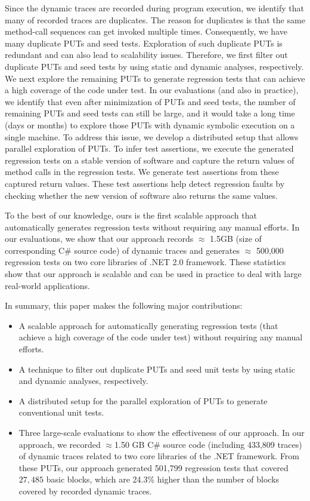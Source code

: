 Since the dynamic traces are recorded during program execution, we identify that many of recorded traces are duplicates. The reason for duplicates is that the same method-call sequences can get invoked multiple times. Consequently, we have many duplicate PUTs and seed tests. Exploration of such duplicate PUTs is redundant and can also lead to scalability issues. Therefore, we first filter out duplicate PUTs and seed tests by using static and dynamic analyses, respectively. We next explore the remaining PUTs to generate regression tests that can achieve a high coverage of the code under test. In our evaluations (and also in practice), we identify that even after minimization of PUTs and seed tests, the number of remaining PUTs and seed tests can still be large, and it would take a long time (days or months) to explore those PUTs with dynamic symbolic execution on a single machine. To address this issue, we develop a distributed setup that allows parallel exploration of PUTs. To infer test assertions, we execute the generated regression tests on a stable version of software and capture the return values of method calls in the regression tests. We generate test assertions from these captured return values. These test assertions help detect regression faults by checking whether the new version of software also returns the same values.

To the best of our knowledge, ours is the first scalable approach that automatically generates regression tests without requiring any manual efforts. In our evaluations, we show that our approach records $\approx$ 1.5GB (size of corresponding C\# source code) of dynamic traces and generates $\approx$ 500,000 regression tests on two core libraries of .NET 2.0 framework. These statistics show that our approach is scalable and can be used in practice to deal with large real-world applications.

In summary, this paper makes the following major contributions:

\begin{itemize}
\item A scalable approach for automatically generating regression tests (that achieve a high coverage of the code under test) without requiring any manual efforts.
\item A technique to filter out duplicate PUTs and seed unit tests by using static and dynamic analyses, respectively.
\item A distributed setup for the parallel exploration of PUTs to generate conventional unit tests.
\item Three large-scale evaluations to show the effectiveness of our approach. In our approach, we recorded $\approx$1.50 GB C\# source code (including 433,809 traces) of dynamic traces related to two core libraries of the .NET framework. From these PUTs, our approach generated 501,799 regression tests that covered $27,485$ basic blocks, which are 24.3\% higher than the number of blocks covered by recorded dynamic traces.
\end{itemize}

